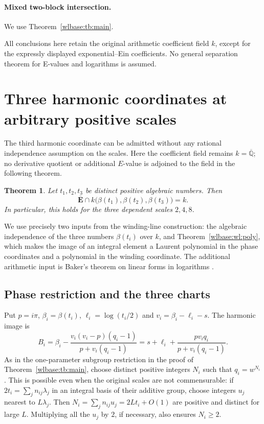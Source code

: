 \documentclass[11pt,a4paper]{article}
\newtheorem{theorem}{Theorem}[section]
\theoremstyle{definition}\newtheorem{definition}[theorem]{Definition}
\theoremstyle{remark}\newtheorem{remark}[theorem]{Remark}
\begin{document}
\paragraph{Mixed two-block intersection.} We use Theorem~\ref{wlbase:tb:main}.

All conclusions here retain the original arithmetic coefficient field
$k$, except for the expressly displayed exponential--Ein coefficients.
No general separation theorem for E-values and logarithms is assumed.

\section{Three harmonic coordinates at arbitrary positive scales}

The third harmonic coordinate can be admitted without any rational
independence assumption on the scales.  Here the coefficient field remains
$k=\overline{\mathbb Q}$; no derivative quotient or additional $E$-value is
adjoined to the field in the following theorem.

\begin{theorem}\label{ext:th3:main}
Let $t_1,t_2,t_3$ be distinct positive algebraic numbers.  Then
\[
 \overline{\mathbf E}\cap
 k\bigl(\beta(t_1),\beta(t_2),\beta(t_3)\bigr)=k.
\]
In particular, this holds for the three dependent scales $2,4,8$.
\end{theorem}

We use precisely two inputs from the winding-line construction: the
algebraic independence of the three numbers $\beta(t_i)$ over $k$, and
Theorem~\ref{wlbase:wl:poly}, which makes the image of an integral element a
Laurent polynomial in the phase coordinates and a polynomial in the
winding coordinate.  The additional arithmetic input is Baker's theorem
on linear forms in logarithms \cite{BakerIII}.

\subsection{Phase restriction and the three charts}
Put $p=i\pi$, $\beta_i=\beta(t_i)$, $\ell_i=\log(t_i/2)$ and
$v_i=\beta_i-\ell_i-s$.  The harmonic image is
\begin{equation}\label{ext:th3:B}
 B_i=\beta_i-\frac{v_i(v_i-p)(q_i-1)}{p+v_i(q_i-1)}
     =s+\ell_i+\frac{p v_iq_i}{p+v_i(q_i-1)}.
\end{equation}
As in the one-parameter subgroup restriction in the proof of
Theorem~\ref{wlbase:tb:main}, choose distinct positive integers $N_i$ such that
$q_i=w^{N_i}$.  This is possible even when the original scales are not
commensurable: if $2t_i=\sum_j n_{ij}\lambda_j$ in an integral basis of
their additive group, choose integers $u_j$ nearest to $L\lambda_j$.
Then $N_i=\sum_jn_{ij}u_j=2Lt_i+O(1)$ are positive and distinct for large
$L$.  Multiplying all the $u_j$ by $2$, if necessary, also ensures
$N_i\ge2$.
\end{document}
